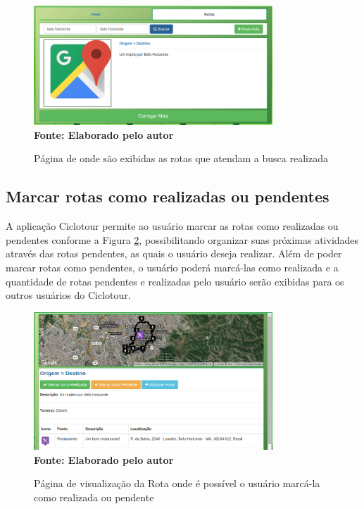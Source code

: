 \begin{figure}[!ht]
	\centering	
	\caption[\hspace{0.1cm} Buscar Rotas.]
	{Página de onde são exibidas as rotas que atendam a busca realizada}
	  \vspace{-0.4cm}
	\includegraphics[width=0.8\textwidth]{figuras/buscarRotas.png}
	 \vspace{0cm}
	\\\textbf{\footnotesize Fonte: Elaborado pelo autor}
	\label{fig:buscarRotas}
\end{figure}

\subsection{Marcar rotas como realizadas ou pendentes}
A aplicação Ciclotour permite ao usuário marcar as rotas como realizadas ou pendentes conforme a Figura \ref{fig:marcarRota}, possibilitando organizar
suas próximas atividades através das rotas pendentes, as quais o usuário deseja realizar. Além de poder marcar rotas como pendentes, o usuário poderá
marcá-las como realizada e a quantidade de rotas pendentes e realizadas pelo usuário serão exibidas para os outros usuários do Ciclotour.

\begin{figure}[!ht]
	\centering	
	\caption[\hspace{0.1cm} Marcar rotas como realizadas ou pendentes.]
	{Página de visualização da Rota onde é possível o usuário marcá-la como realizada ou pendente}
	  \vspace{-0.4cm}
	\includegraphics[width=0.8\textwidth]{figuras/marcarRota.png}
	 \vspace{0cm}
	\\\textbf{\footnotesize Fonte: Elaborado pelo autor}
	\label{fig:marcarRota}
\end{figure}

